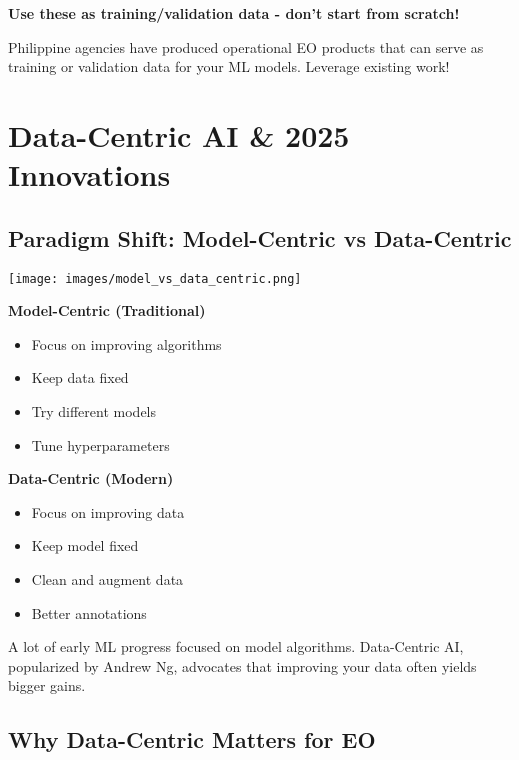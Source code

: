 \documentclass[
  letterpaper,
  DIV=11,
  numbers=noendperiod]{scrartcl}
\providecommand{\tightlist}{%
  \setlength{\itemsep}{0pt}\setlength{\parskip}{0pt}}
\begin{document}
\textbf{Use these as training/validation data - don't start from
scratch!}

Philippine agencies have produced operational EO products that can serve
as training or validation data for your ML models. Leverage existing
work!

\section{Data-Centric AI \& 2025
Innovations}\label{data-centric-ai-2025-innovations}

\subsection{Paradigm Shift: Model-Centric vs
Data-Centric}\label{paradigm-shift-model-centric-vs-data-centric}

\begin{center}
\texttt{[image: images/model\_vs\_data\_centric.png]}
\end{center}

\textbf{Model-Centric (Traditional)}

\begin{itemize}
\tightlist
\item
  Focus on improving algorithms
\item
  Keep data fixed
\item
  Try different models
\item
  Tune hyperparameters
\end{itemize}

\textbf{Data-Centric (Modern)}

\begin{itemize}
\tightlist
\item
  Focus on improving data
\item
  Keep model fixed
\item
  Clean and augment data
\item
  Better annotations
\end{itemize}

A lot of early ML progress focused on model algorithms. Data-Centric AI,
popularized by Andrew Ng, advocates that improving your data often
yields bigger gains.

\subsection{Why Data-Centric Matters for
EO}\label{why-data-centric-matters-for-eo}
\end{document}
